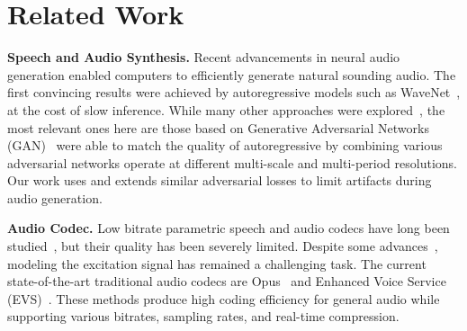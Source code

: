 \section{Related Work}

{\noindent \bf Speech and Audio Synthesis.} Recent advancements in neural audio generation enabled computers to efficiently generate natural sounding audio. 
The first convincing results were achieved by autoregressive models such as WaveNet~\citep{oord2016wavenet}, at the cost of slow inference.
While many other approaches were explored~\citep{parallelwavegan,wavernn,goel2022s}, the most relevant ones here are those based on Generative Adversarial Networks (GAN)~\citep{melgan, parallelwavegan, hifigan, hifi++} were able to match the quality of autoregressive  by combining various adversarial networks operate at different multi-scale and multi-period resolutions. Our work uses and extends similar adversarial losses to limit artifacts during audio generation.


{\noindent \bf Audio Codec.} Low bitrate parametric speech and audio codecs have long been studied~\citep{atal1971speech, juang1982multiple}, but their quality has been severely limited. Despite some advances~\citep{griffin1985new, mccree19962}, modeling the excitation signal has remained a challenging task. The current state-of-the-art traditional audio codecs are Opus~\citep{valin2012definition} and Enhanced Voice Service (EVS)~\citep{dietz2015overview}. These methods produce high coding efficiency for general audio while supporting various bitrates, sampling rates, and real-time compression. 

